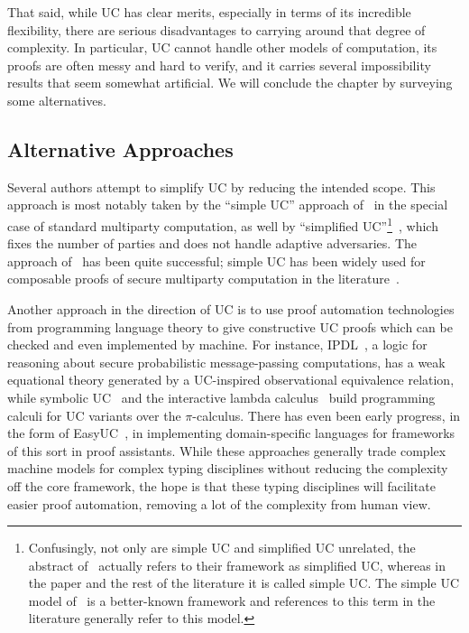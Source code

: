 That said, while UC has clear merits, especially in terms of its incredible
flexibility, there are serious disadvantages to carrying around that degree of
complexity. In particular, UC cannot handle other models of computation, its
proofs are often messy and hard to verify, and it carries several
impossibility results that seem somewhat artificial. We will conclude the
chapter by surveying some alternatives.

\subsection{Alternative Approaches}

Several authors attempt to simplify UC by reducing the intended scope. This
approach is most notably taken by the ``simple UC'' approach of~\cite{ccl-2015}
in the special case of standard multiparty computation, as well by ``simplified
UC''\footnote{
  Confusingly, not only are simple UC and simplified UC unrelated, the abstract
  of~\cite{ccl-2015} actually refers to their framework as simplified UC,
  whereas in the paper and the rest of the literature it is called simple UC.
  The simple UC model of~\cite{ccl-2015} is a better-known
framework and references to this term in the literature generally refer to this
model.}~\cite{wikstr-2016}, which fixes the number of parties and does not handle
adaptive adversaries. The approach of~\cite{ccl-2015} has been quite successful;
simple UC has been widely used for composable proofs of secure multiparty computation
in the literature~\cite{mansy-2019,hazay-2020,lindell-2022,scheffler-2023}.

Another approach in the direction of UC is to use proof automation technologies
from programming language theory to give constructive UC proofs which can be
checked and even implemented by machine. For instance,
IPDL~\cite{morisett-et-al-2021}, a logic for reasoning about secure
probabilistic message-passing computations, has a weak equational theory
generated by a UC-inspired observational equivalence relation, while symbolic
UC~\cite{bohl-unruh-2013} and the interactive lambda
calculus~\cite{liao-et-al-2019} build programming calculi for UC variants over
the $\pi$-calculus. There has even been early progress, in the form of
EasyUC~\cite{canetti-et-al-2019}, in implementing domain-specific languages for
frameworks of this sort in proof assistants. While these approaches generally
trade complex machine models for complex typing disciplines without reducing the
complexity off the core framework, the hope is that these typing disciplines
will facilitate easier proof automation, removing a lot of the complexity from
human view.

